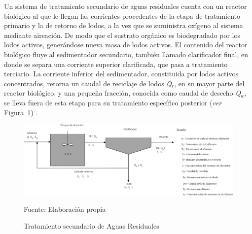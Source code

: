 Un sistema de tratamiento secundario de aguas residuales cuenta con un reactor biológico al que le llegan las corrientes procedentes de la etapa de tratamiento primario y la de retorno de lodos, a la vez que se suministra oxígeno al sistema mediante aireación. De modo que el sustrato orgánico es biodegradado por los lodos activos, generándose nueva masa de lodos activos. El contenido del reactor biológico fluye al sedimentador secundario, también llamado clarificador final, en donde se separa una corriente superior clarificada, que pasa a tratamiento terciario. La corriente inferior del sedimentador, constituida por lodos activos concentrados, retorna un caudal de reciclaje de lodos \emph{Q$_{r}$}, en su mayor parte del reactor biológico, y una pequeña fracción, conocida como caudal de desecho \emph{Q$_{w}$}, se lleva fuera de esta etapa para su tratamiento específico posterior (\emph{ver} Figura~\ref{fig:balance}) \emph{\citep{manuel13}}.
	\begin{figure}[!h]
		\centering
		\includegraphics[scale=0.52]{Diagrama_de_flujo.png}
		\caption{Tratamiento secundario de Aguas Residuales}
		\small{Fuente: Elaboración propia}
		\label{fig:balance}
	\end{figure}
